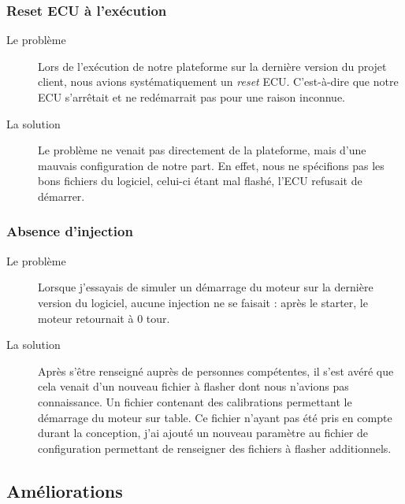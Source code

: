	\subsubsection{Reset ECU à l'exécution}
	\begin{description}
		\item[Le problème] Lors de l'exécution de notre plateforme sur la dernière version du projet client, nous avions systématiquement un \textit{reset} ECU. C'est-à-dire que notre ECU s'arrêtait et ne redémarrait pas pour une raison inconnue.
		\item[La solution] Le problème ne venait pas directement de la plateforme, mais d'une mauvais configuration de notre part. En effet, nous ne spécifions pas les bons fichiers du logiciel, celui-ci étant mal flashé, l'ECU refusait de démarrer.
	\end{description}
	
	\subsubsection{Absence d'injection}
	\begin{description}
		\item[Le problème] Lorsque j'essayais de simuler un démarrage du moteur sur la dernière version du logiciel, aucune injection ne se faisait : après le starter, le moteur retournait à 0 tour.
		\item[La solution] Après s'être renseigné auprès de personnes compétentes, il s'est avéré que cela venait d'un nouveau fichier à flasher dont nous n'avions pas connaissance. Un fichier contenant des calibrations permettant le démarrage du moteur sur table. Ce fichier n'ayant pas été pris en compte durant la conception, j'ai ajouté un nouveau paramètre au fichier de configuration permettant de renseigner des fichiers à flasher additionnels.
	\end{description}
	
\subsection{Améliorations}
